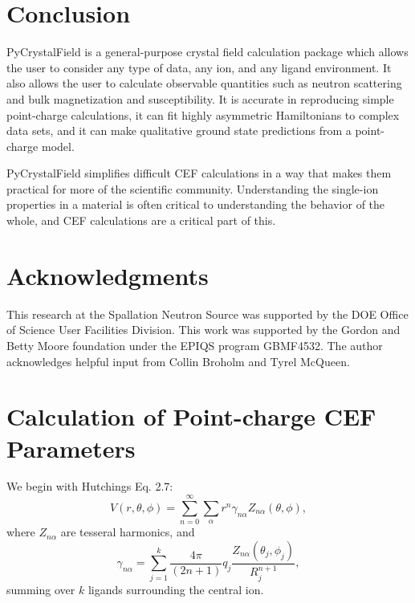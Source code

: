 \documentclass[twocolumn,english,prb]{revtex4-2}
\begin{document}
\section{Conclusion}

PyCrystalField is a general-purpose crystal field calculation package which allows the user to consider any type of data, any ion, and any ligand environment. It also allows the user to calculate observable quantities such as neutron scattering and bulk magnetization and susceptibility. It is accurate in reproducing simple point-charge calculations, it can fit highly asymmetric Hamiltonians to complex data sets, and it can make qualitative ground state predictions from a point-charge model.

PyCrystalField simplifies difficult CEF calculations in a way that makes them practical for more of the scientific community. Understanding the single-ion properties in a material is often critical to understanding the behavior of the whole, and CEF calculations are a critical part of this.

\section*{Acknowledgments}

This research at the Spallation Neutron Source was supported by the DOE Office of Science User Facilities Division. 
This work was supported by the Gordon and Betty Moore foundation under the EPIQS program GBMF4532.
The author acknowledges helpful input from Collin Broholm and Tyrel McQueen.


\appendix


\section{Calculation of Point-charge CEF Parameters}\label{PC_CEF_B}


We begin with Hutchings \cite{Hutchings1964} Eq. 2.7:
$$
V(r,\theta,\phi)=\sum_{n=0}^{\infty}\sum_{\alpha}r^{n}\gamma_{n\alpha}Z_{n\alpha}(\theta,\phi),
$$
where $Z_{n\alpha}$ are tesseral harmonics, and 
\begin{equation}
\gamma_{n\alpha}=\sum_{j=1}^{k}\frac{4\pi}{(2n+1)}q_{j}\frac{Z_{n\alpha}(\theta_{j},\phi_{j})}{R_{j}^{n+1}},
\end{equation}
summing over $k$ ligands surrounding the central ion. 
\end{document}
